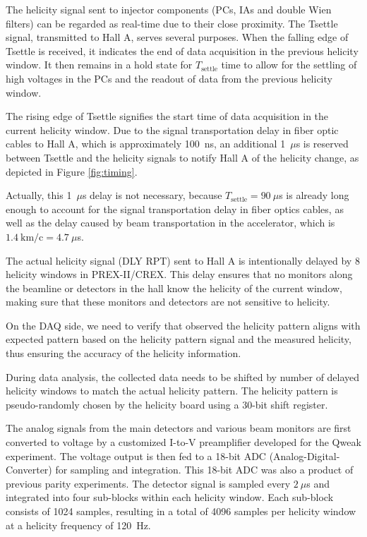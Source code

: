 The helicity signal sent to injector components (PCs, IAs and double Wien filters) 
can be regarded as real-time due to their close proximity. The Tsettle signal, transmitted to Hall A, serves several purposes. When the falling edge of Tsettle is received, it indicates the end of data acquisition in the previous helicity window. It then remains in a hold state for $T_{\text{settle}}$ time to allow for the settling of high voltages in the PCs and the readout of data from the previous helicity window.

The rising edge of Tsettle signifies the start time of data acquisition in the current helicity window. Due to the signal transportation delay in fiber optic cables to Hall A, which is approximately 100~ns, an additional 1~$\mu$s is reserved between Tsettle and the helicity signals to notify Hall A of the helicity change, as depicted in Figure \ref{fig:timing}.

Actually, this 1~$\mu$s delay is not necessary, because $T_{\text{settle}} = 90\ \mu$s is already long 
enough to account for the signal transportation delay in fiber optics cables, as well as the delay 
caused by beam transportation in the accelerator, which is $1.4 \ \text{km/c} = 4.7\ \mu$s.

The actual helicity signal (DLY RPT) sent to Hall A is intentionally delayed 
by 8 helicity windows in PREX-II/CREX. This delay ensures that no monitors 
along the beamline or detectors in the hall know the helicity of the current window, 
making sure that these monitors and detectors are not sensitive to helicity. 

On the DAQ side, we need to verify that observed the helicity pattern aligns 
with expected pattern based on the helicity pattern signal and the 
measured helicity, thus ensuring the accuracy of the helicity information. 

During data analysis, the collected data needs to be shifted by number of 
delayed helicity windows to match the actual helicity pattern. 
The helicity pattern is pseudo-randomly chosen by the helicity board 
using a 30-bit shift register.

The analog signals from the main detectors and various beam monitors are first 
converted to voltage by a customized I-to-V preamplifier developed for the Qweak experiment.
The voltage output is then fed to a 18-bit ADC (Analog-Digital-Converter) for sampling
and integration. This 18-bit ADC was also a product of previous parity experiments. 
The detector signal is sampled every $2\ \mu$s and integrated into four sub-blocks 
within each helicity window. Each sub-block consists of 1024 samples, resulting in
a total of 4096 samples per helicity window at a helicity frequency of 120~Hz.

